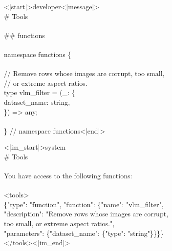 \begin{figure}[H]
\begin{minipage}{0.8\linewidth}
\begin{tcolorbox}[enhanced, colback=harmonybg, colframe=harmonyframe, boxrule=0.8pt, left=4pt, right=4pt, top=4pt, bottom=3pt, sharp corners,
  attach boxed title to top left={xshift=4pt, yshift=-2pt},
  boxed title style={empty, size=minimal},
  coltitle=harmonyframe, fonttitle=\sffamily\bfseries\large,
  title={gpt-oss-120b}]
\ttfamily\scriptsize
<|start|>developer<|message|>\\
\# Tools\\
\\
\#\# functions\\
\\
namespace functions \{\\
\\
// \colorbox{yellow!30}{Remove rows whose images are corrupt, too small,}\\
// \colorbox{yellow!30}{or extreme aspect ratios.}\\
type vlm\_filter = (\_: \{\\
dataset\_name: string,\\
\}) => any;\\
\\
\} // namespace functions<|end|>
\end{tcolorbox}

\vspace{-4pt}

\begin{tcolorbox}[enhanced, colback=qwenbg, colframe=qwenframe, boxrule=0.8pt, left=4pt, right=4pt, top=4pt, bottom=3pt, sharp corners,
  attach boxed title to top left={xshift=4pt, yshift=-2pt},
  boxed title style={empty, size=minimal},
  coltitle=qwenframe, fonttitle=\sffamily\bfseries\large,
  title={Qwen 3.5}]
\ttfamily\scriptsize
<|im\_start|>system\\
\# Tools\\
\\
You have access to the following functions:\\
\\
<tools>\\
\{"type": "function", "function": \{"name": "vlm\_filter",\\
"description": \colorbox{yellow!30}{"Remove rows whose images are corrupt,}\\
\colorbox{yellow!30}{too small, or extreme aspect ratios."},\\
"parameters": \{"dataset\_name": \{"type": "string"\}\}\}\}\\
</tools><|im\_end|>
\end{tcolorbox}


\end{minipage}
\end{figure}
